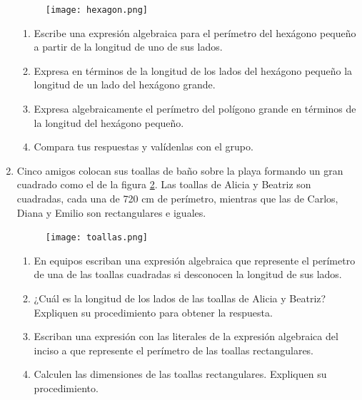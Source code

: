 \documentclass[11pt]{book}
\begin{document}
\begin{enumerate}
        \begin{minipage}{0.25\textwidth}
          \begin{figure}[H]
            \centering
            \texttt{[image: hexagon.png]}
            \label{fig:hexagon}
          \end{figure}
        \end{minipage}\hfill
        \begin{minipage}{0.65\textwidth}
          \begin{enumerate}
            \item Escribe una expresión algebraica para el perímetro del hexágono pequeño a partir de la longitud de uno de sus lados.
            \item Expresa en términos de la longitud de los lados del hexágono pequeño la longitud de un lado del hexágono grande.
            \item Expresa algebraicamente el perímetro del polígono grande en términos de la longitud del hexágono pequeño.
            \item Compara tus respuestas y valídenlas con el grupo.
          \end{enumerate}
        \end{minipage}

  \item  Cinco amigos colocan sus toallas de baño sobre la playa formando un gran cuadrado como el de la figura \ref{fig:toallas}.
        Las toallas de Alicia y Beatriz son cuadradas, cada
        una de 720 cm de perímetro, mientras que las de Carlos, Diana y Emilio son rectangulares e iguales.
        \begin{minipage}{0.25\textwidth}
          \begin{figure}[H]
            \centering
            \texttt{[image: toallas.png]}
            \label{fig:toallas}
          \end{figure}
        \end{minipage}\hfill
        \begin{minipage}{0.65\textwidth}
          \begin{enumerate}
            \item En equipos escriban una expresión algebraica que represente el perímetro de una de las toallas cuadradas si desconocen la longitud de sus lados.
            \item ¿Cuál es la longitud de los lados de las toallas de Alicia y Beatriz? Expliquen su procedimiento para obtener la respuesta.
            \item Escriban una expresión con las literales de la expresión algebraica del inciso a que represente el perímetro de las toallas rectangulares.
            \item Calculen las dimensiones de las toallas rectangulares. Expliquen su procedimiento.
          \end{enumerate}
        \end{minipage}

\end{enumerate}
\end{document}
